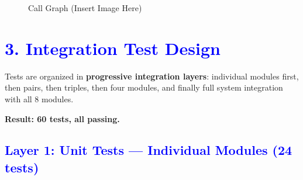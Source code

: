 \documentclass{article}
\begin{document}
\begin{figure}[h]
  \centering
  \fbox{\rule{0pt}{3in} \rule{0.9\textwidth}{0pt}} %
  \caption{Call Graph (Insert Image Here)}
  \label{fig:call_graph}
\end{figure}

\section*{\textcolor{blue}{3. Integration Test Design}}

Tests are organized in \textbf{progressive integration layers}: individual modules first, then pairs, then triples, then four modules, and finally full system integration with all 8 modules.

\textbf{Result: 60 tests, all passing.}

\renewcommand{\labelitemi}{\textcolor{blue}{$\bullet$}}

\subsection*{\textcolor{blue}{Layer 1: Unit Tests — Individual Modules (24 tests)}}

\end{document}
